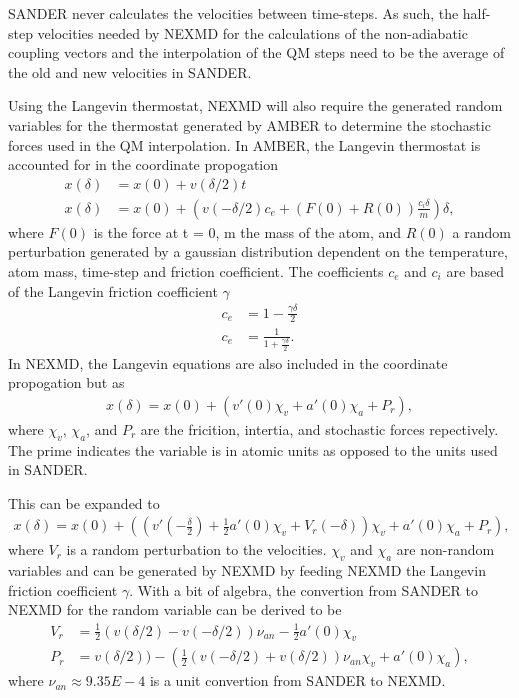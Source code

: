 SANDER never calculates the velocities between time-steps.  As such,
the half-step velocities needed by NEXMD for the calculations of the
non-adiabatic coupling vectors and the interpolation of the QM steps
need to be the average of the old and new velocities in SANDER.

Using the Langevin thermostat, NEXMD will also require the generated
random variables for the thermostat generated by AMBER to determine
the stochastic forces used in the QM
interpolation.\cite{paterlini1998constant} In AMBER, the Langevin
thermostat is accounted for in the coordinate propogation
\begin{align}
  x(\delta) &= x(0) + v(\delta/2) t\\
  x(\delta) &= x(0) + \left(v(-\delta/2) c_e + (F(0) + R(0)) \frac{c_i \delta}{m} \right) \delta,
\end{align}
where \(F(0)\) is the force at t = 0, m the mass of the atom, and
\(R(0)\) a random perturbation generated by a gaussian distribution
dependent on the temperature, atom mass, time-step and friction
coefficient.  The coefficients \(c_e\) and \(c_i\) are based of the
Langevin friction coefficient \(\gamma\)
\begin{align}
  c_e &= 1 - \frac{\gamma\delta}{2}\\
  c_e &= \frac{1}{1 + \frac{\gamma \delta}{2}}.
\end{align}
In NEXMD, the Langevin equations are also included in the coordinate propogation but as
\begin{align}
  x(\delta) = x(0) + (v'(0)\chi_v + a'(0)\chi_a + P_r),
\end{align}
where \(\chi_v\), \(\chi_a\), and \(P_r\) are the fricition, intertia,
and stochastic forces repectively.  The prime indicates the variable
is in atomic units as opposed to the units used in SANDER.

This can be expanded to 
\begin{align}
  x(\delta) = x(0) + ((v'(-\frac{\delta}{2}) + \frac{1}{2}a'(0)\chi_v + V_r(-\delta))\chi_v + a'(0)\chi_a + P_r),
\end{align}
where \(V_r\) is a random perturbation to the velocities.
\(\chi_v\) and \(\chi_a\) are non-random variables and can be generated by NEXMD by feeding NEXMD the Langevin friction coefficient \(\gamma\).
With a bit of algebra, the convertion from SANDER to NEXMD for the random variable can be derived to be
\begin{align}
  V_r &= \frac{1}{2}(v(\delta/2) - v(-\delta/2))\nu_{an} - \frac{1}{2}a'(0)\chi_v\\
  P_r &= v(\delta/2)) - \left( \frac{1}{2} (v(-\delta/2) + v(\delta/2))\nu_{an}\chi_v + a'(0)\chi_a \right),
\end{align}
where \(\nu_{an} \approx 9.35E-4\) is a unit convertion from SANDER to NEXMD.

